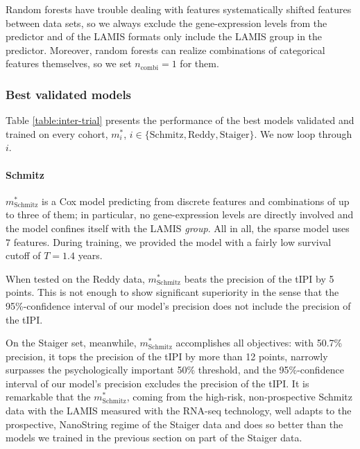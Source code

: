 Random forests have trouble dealing with features systematically shifted features between data sets, so 
we always exclude the gene-expression levels from the predictor and of the LAMIS formats only 
include the LAMIS group in the predictor. Moreover, random forests can realize combinations of 
categorical features themselves, so we set $n_\text{combi} = 1$ for them.

\subsubsection{Best validated models}

Table \ref{table:inter-trial} presents the performance of the best models validated and trained on 
every cohort, $m_i^*$, $i \in \{ \text{Schmitz}, \text{Reddy}, \text{Staiger} \}$. We now loop 
through $i$.



\paragraph{Schmitz}
$m^*_\text{Schmitz}$ is a Cox model predicting from discrete features and combinations of up to 
three of them; in particular, no gene-expression levels are directly involved and the model confines 
itself with the LAMIS \textit{group}. All in all, the sparse model uses \num{7} features. During 
training, we provided the model with a fairly low survival cutoff of $T = \num{1.4}$ years.

When tested on the Reddy data, $m^*_\text{Schmitz}$ beats the precision of the tIPI by 5 points. This 
is not enough to show significant superiority in the sense that the \num{95}\%-confidence interval 
of our model's precision does not include the precision of the tIPI.

On the Staiger set, meanwhile, $m^*_\text{Schmitz}$ accomplishes all objectives: with 
\num{50.7}\% precision, it tops the precision of the tIPI by more than 12 points, narrowly surpasses the 
psychologically important \num{50}\% threshold, and the \num{95}\%-confidence interval of our model's 
precision excludes the precision of the tIPI. It is remarkable that the $m^*_\text{Schmitz}$, coming from 
the high-risk, non-prospective Schmitz data with the LAMIS measured with the 
RNA-seq technology, well adapts to the prospective, NanoString regime of the Staiger data and 
does so better than the models we trained in the previous section on part of the Staiger data.


